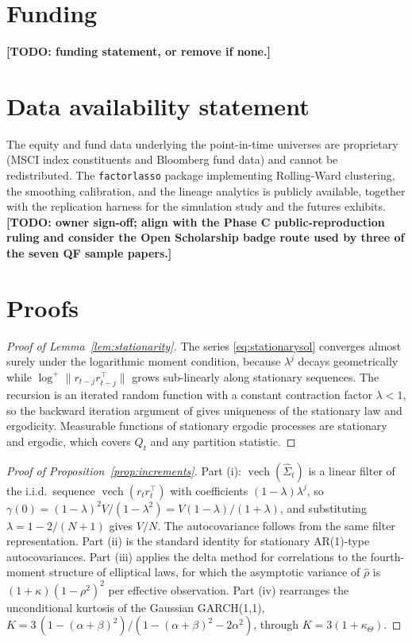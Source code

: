 \documentclass[11pt]{article}
\theoremstyle{remark}
\newcommand{\vech}{\operatorname{vech}}
\newcommand{\TODO}[1]{\textbf{[TODO: #1]}}
\begin{document}
\section*{Funding}
\TODO{funding statement, or remove if none.}

\section*{Data availability statement}
The equity and fund data underlying the point-in-time universes are
proprietary (MSCI index constituents and Bloomberg fund data) and cannot be
redistributed. The \texttt{factorlasso} package implementing Rolling-Ward
clustering, the smoothing calibration, and the lineage analytics is publicly
available, together with the replication harness for the simulation study and
the futures exhibits. \TODO{owner sign-off; align with the Phase C
public-reproduction ruling and consider the Open Scholarship badge route used
by three of the seven QF sample papers.}

\appendix
\section{Proofs}
\label{app:proofs}


\begin{proof}[Proof of Lemma~\ref{lem:stationarity}]
The series \eqref{eq:stationarysol} converges almost surely under the
logarithmic moment condition, because $\lambda^j$ decays geometrically while
$\log^{+}\|r_{t-j} r_{t-j}^{\top}\|$ grows sub-linearly along stationary
sequences. The recursion is an iterated random function with a constant
contraction factor $\lambda < 1$, so the backward iteration argument of
\citet{diaconis1999iterated} gives uniqueness of the stationary law and
ergodicity. Measurable functions of stationary ergodic processes are stationary
and ergodic, which covers $Q_t$ and any partition statistic.
\end{proof}

\begin{proof}[Proof of Proposition~\ref{prop:increments}]
Part (i): $\vech(\widehat{\Sigma}_t)$ is a linear filter of the i.i.d.\
sequence $\vech(r_t r_t^{\top})$ with coefficients $(1-\lambda)\lambda^{j}$, so
$\gamma(0) = (1-\lambda)^2 V / (1-\lambda^2) = V(1-\lambda)/(1+\lambda)$, and
substituting $\lambda = 1 - 2/(N+1)$ gives $V/N$. The autocovariance follows
from the same filter representation. Part (ii) is the standard identity for
stationary AR(1)-type autocovariances. Part (iii) applies the delta method for
correlations to the fourth-moment structure of elliptical laws, for which the
asymptotic variance of $\widehat{\rho}$ is $(1+\kappa)(1-\rho^2)^2$ per
effective observation. Part (iv) rearranges the unconditional kurtosis of the
Gaussian GARCH(1,1), $K = 3\,(1-(\alpha+\beta)^2)/(1-(\alpha+\beta)^2-2\alpha^2)$,
through $K = 3(1+\kappa_{\Theta})$.
\end{proof}
\end{document}
